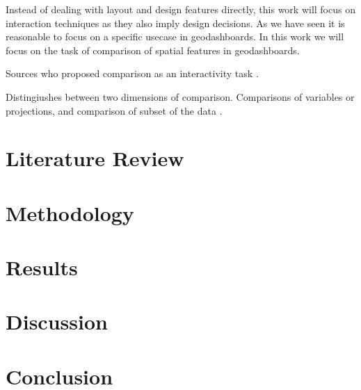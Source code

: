 \documentclass[12pt, twoside]{report}
\begin{document}
Instead of dealing with layout and design features directly, this work will focus on
interaction techniques as they also imply design decisions. As we have seen it is
reasonable to focus on a specific usecase in geodashboards. In this work we will focus
on the task of comparison of spatial features in geodashboards.

Sources who proposed comparison as an interactivity task
\citep*{Crampton.2002,Buja.1996,Gorte.2022}.

Distingiushes between two dimensions of comparison. Comparisons of
variables or projections, and comparison of subset of the data \citep*{Buja.1996}.


\chapter{Literature Review}

\chapter{Methodology}

\chapter{Results}

\chapter{Discussion}

\chapter{Conclusion}



\end{document}
